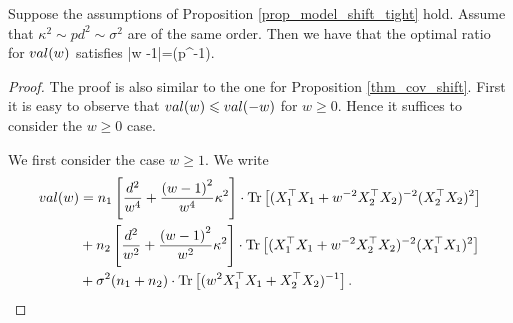 \begin{lemma}\label{lem_hat_v}
Suppose the assumptions of Proposition \ref{prop_model_shift_tight} hold. Assume that $ \kappa^2 \sim pd^2 \sim \sigma^2$ are of the same order. Then we have that the optimal ratio for $val(w)$ satisfies
	\be\label{hatw_add1}|\hat w -1|=\OO(p^{-1}).\ee
\end{lemma}
\begin{proof}
The proof is also similar to the one for Proposition \ref{thm_cov_shift}. First it is easy to observe that $val(w)\leqslant val(-w)$ for $w\ge 0$. Hence it suffices to consider the $w\ge 0$ case.

We first consider the case $w\ge 1$. We write
\begin{align}
	\val(w) &= n_1\left[\frac{d^2}{w^4} +\frac{\left( w-1\right)^2}{w^4}\kappa^2\right]\cdot \tr\left[( X_1^{\top}X_1 +w^{-2}X_2^{\top}X_2)^{-2} (X_2^{\top}X_2)^2\right] \nonumber \\
	& + n_2\left[\frac{d^2}{w^2} +\frac{\left( w-1\right)^2}{w^2}\kappa^2\right]\cdot \tr\left[( X_1^{\top}X_1 +w^{-2}X_2^{\top}X_2)^{-2} (X_1^{\top}X_1)^2\right] \nonumber\\
			& + \sigma^2(n_1+n_2) \cdot \bigtr{(w^{2}X_1^{\top}X_1  + X_2^{\top}X_2)^{-1} } .\nonumber%
\end{align}


\end{proof}
